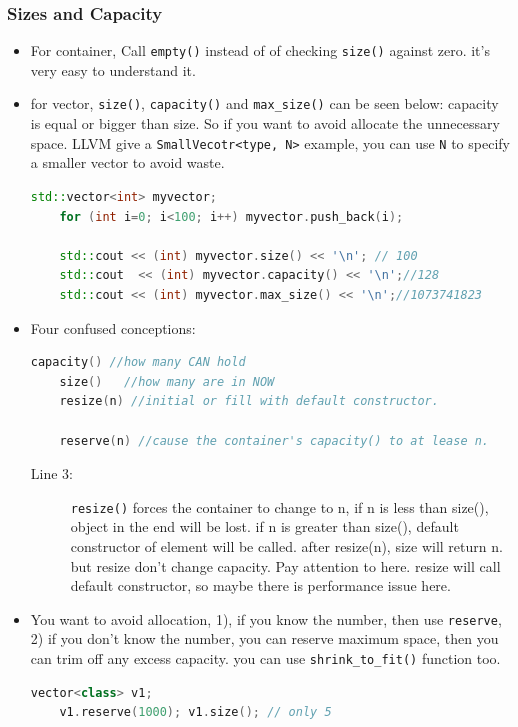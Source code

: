 \documentclass[a4paper,11pt,twoside]{book}
\begin{document}
\subsubsection{Sizes and Capacity}
\begin{itemize}
	\item For container, Call \texttt{empty()} instead of of checking \texttt{size()} against zero. it's very easy to understand it.
	
	\item for vector, \texttt{size()}, \texttt{capacity()} and \texttt{max\_size()} can be seen below: capacity is equal or bigger than size. So if you want to avoid allocate the unnecessary space.  LLVM give a \texttt{SmallVecotr<type, N>} example, you can use \texttt{N} to specify a smaller vector to avoid waste.
\begin{lstlisting}[frame=single, language=c++]
	std::vector<int> myvector;
	for (int i=0; i<100; i++) myvector.push_back(i);
	
	std::cout << (int) myvector.size() << '\n'; // 100
	std::cout  << (int) myvector.capacity() << '\n';//128
	std::cout << (int) myvector.max_size() << '\n';//1073741823
\end{lstlisting}	
	
	
	\item Four confused conceptions:
\begin{lstlisting}[frame=single, language=c++]
	capacity() //how many CAN hold
	size()   //how many are in NOW
	resize(n) //initial or fill with default constructor.
	
	reserve(n) //cause the container's capacity() to at lease n.
\end{lstlisting}	
	\begin{description}
		\item[Line 3:] \texttt{resize()} forces the container to change to n, if n is less than size(),  object in the end will be lost. if n is greater than size(),  default constructor of element will be called. after resize(n), size will return n. but resize don't change capacity. Pay attention to here. resize will call default constructor, so maybe there is performance issue here. 
	\end{description}
	
	\item You want to avoid allocation, 1), if you know the number, then use \texttt{reserve}, 2) if you don't know the number, you can reserve maximum space, then you can trim off any excess capacity.  you can use \texttt{shrink\_to\_fit()} function too. 
\begin{lstlisting}[frame=single, language=c++]
	vector<class> v1;
	v1.reserve(1000); v1.size(); // only 5
	

\end{lstlisting}
\end{itemize}
\end{document}
